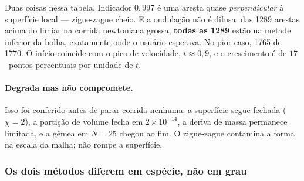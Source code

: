 \begin{table}[htbp]
\centering
\caption{Ondula\c{c}\~ao no \'ultimo quadro. ``Acima'' \'e a fra\c{c}\~ao de
arestas com indicador acima de $0{,}05$.}
\label{tab:tsur-ond}
\small
\begin{adjustbox}{max width=\linewidth}
\end{adjustbox}
\end{table}

Duas coisas nessa tabela. Indicador $0{,}997$ \'e uma aresta quase
\emph{perpendicular} \`a superf\'icie local --- zigue-zague cheio. E a
ondula\c{c}\~ao n\~ao \'e difusa: das 1289 arestas acima do limiar na corrida
newtoniana grossa, \textbf{todas as 1289} est\~ao na metade inferior da bolha,
exatamente onde o usu\'ario esperava. No pior caso, 1765 de 1770. O in\'icio
coincide com o pico de velocidade, $t\approx 0{,}9$, e o crescimento \'e de
$17$~pontos percentuais por unidade de $t$.

\paragraph{Degrada mas n\~ao compromete.} Isso foi conferido antes de parar
corrida nenhuma: a superf\'icie segue fechada ($\chi = 2$), a parti\c{c}\~ao de
volume fecha em $2\times10^{-14}$, a deriva de massa permanece limitada, e a
g\^emea em $N=25$ chegou ao fim. O zigue-zague contamina a forma na escala da
malha; n\~ao rompe a superf\'icie.

\subsubsection{Os dois m\'etodos diferem em esp\'ecie, n\~ao em grau}

\begin{table}[htbp]
\centering
\caption{O indicador no tempo, mesmo caso, nos dois m\'etodos. O
\emph{n\'ivel} do VOF n\~ao \'e compar\'avel --- ver abaixo.}
\label{tab:tsur-tempo}
\small
{}
\end{table}

